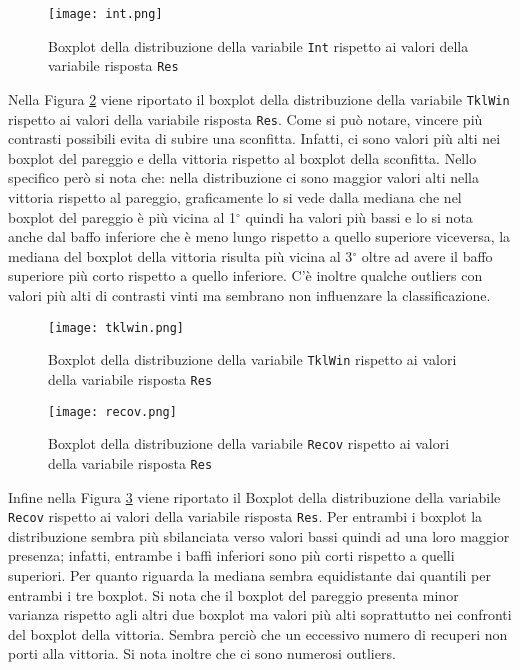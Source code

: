 \begin{figure}[htbp]
	\begin{center}
		\texttt{[image: int.png]}
		\caption{Boxplot della distribuzione della variabile \texttt{Int} rispetto ai valori della variabile risposta \texttt{Res}} \label{fig:int}
	\end{center}
\end{figure}

Nella Figura \ref{fig:tkl} viene riportato il boxplot della distribuzione della variabile \texttt{TklWin} rispetto ai valori della variabile risposta \texttt{Res}. Come si può notare, vincere più contrasti possibili evita di subire una sconfitta. Infatti, ci sono valori più alti nei boxplot del pareggio e della vittoria rispetto al boxplot della sconfitta. Nello specifico però si nota che: nella distribuzione ci sono maggior valori alti nella vittoria rispetto al pareggio, graficamente lo si vede dalla mediana che nel boxplot del pareggio è più vicina al 1$^{\circ}$ quindi ha valori più bassi e lo si nota anche dal baffo inferiore che è meno lungo rispetto a quello superiore viceversa, la mediana del boxplot della vittoria risulta più vicina al 3$^{\circ}$ oltre ad avere il baffo superiore più corto rispetto a quello inferiore. C'è inoltre qualche outliers con valori più alti di contrasti vinti ma sembrano non influenzare la classificazione.\\

\begin{figure}[htbp]
	\begin{center}
		\texttt{[image: tklwin.png]}
		\caption{Boxplot della distribuzione della variabile \texttt{TklWin} rispetto ai valori della variabile risposta \texttt{Res}} \label{fig:tkl}
	\end{center}
\end{figure}

\begin{figure}[htbp]
	\begin{center}
		\texttt{[image: recov.png]}
		\caption{Boxplot della distribuzione della variabile \texttt{Recov} rispetto ai valori della variabile risposta \texttt{Res}} \label{fig:recov}
	\end{center}
\end{figure} 

Infine nella Figura \ref{fig:recov} viene riportato il Boxplot della distribuzione della variabile \texttt{Recov} rispetto ai valori della variabile risposta \texttt{Res}. Per entrambi i boxplot la distribuzione sembra più sbilanciata verso valori bassi quindi ad una loro maggior presenza; infatti, entrambe i baffi inferiori sono più corti rispetto a quelli superiori. Per quanto riguarda la mediana sembra equidistante dai quantili per entrambi i tre boxplot. Si nota che il boxplot del pareggio presenta minor varianza rispetto agli altri due boxplot ma valori più alti soprattutto nei confronti del boxplot della vittoria. Sembra perciò che un eccessivo numero di recuperi non porti alla vittoria. Si nota inoltre che ci sono numerosi outliers.

